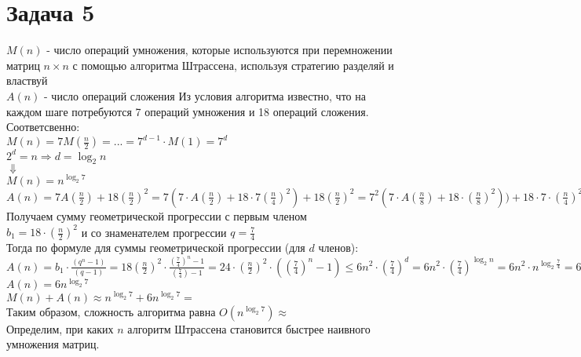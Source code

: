 \documentclass[12pt]{article}
\begin{document}
	\section*{Задача 5}
	$M(n)$ - число операций умножения, которые используются при перемножении матриц $n\times n$ с помощью алгоритма Штрассена, используя стратегию разделяй и властвуй\\
	$A(n)$ - число операций сложения
	Из условия алгоритма известно, что на каждом шаге потребуются 7 операций умножения и 18 операций сложения. Соответсвенно:\\
	$M(n) = 7M(\frac{n}{2}) = ... = 7^{d-1}\cdot M(1) = 7^{d}$\\
	$2^{d} = n \Rightarrow d = \log_{2}{n}$\\
	$\Downarrow$	\\
	$M(n) = n^{\log_{2}{7}}$ \\
	$A(n) = 7A(\frac{n}{2}) + 18{(\frac{n}{2})}^2 = 7(7\cdot A(\frac{n}{2}) + 18\cdot7{(\frac{n}{4})}^2) + 18{(\frac{n}{2})}^2 = 7^{2}(7\cdot A(\frac{n}{8}) + 18\cdot {(\frac{n}{8})}^2)) + 18\cdot 7\cdot{(\frac{n}{4})}^2 + 18\cdot {(\frac{n}{2})}^2 = 7^{3}\cdot A(\frac{n}{8}) + 7^{2}\cdot 18{(\frac{n}{8})}^2 + 18 \cdot 7{(\frac{n}{4})}^2 + 18\cdot {(\frac{n}{2})}^2$ \\
	Получаем сумму геометрической прогрессии с первым членом \\ 
	$b_{1} = 18\cdot {(\frac{n}{2})}^2$ и со знаменателем прогрессии $q = \frac{7}{4}$ \\
	Тогда по формуле для суммы геометрической прогрессии (для $d$ членов): \\
	$A(n) = b_{1}\cdot \frac{(q^{n} - 1)}{(q - 1)} = 18{(\frac{n}{2})}^2 \cdot \frac{{(\frac{7}{4})}^{n} - 1}{(\frac{7}{4}) - 1} = 24\cdot {(\frac{n}{2})}^2 \cdot ({(\frac{7}{4})}^n - 1) \leq 6n^{2}\cdot {(\frac{7}{4})}^{d} = 6n^{2}\cdot {(\frac{7}{4})}^{\log_{2}{n}} = 6n^{2}\cdot n^{\log_{2}{\frac{7}{4}}} = 6n^{2}\cdot n^{\log_{2}{7}}\cdot \frac{1}{n^{2}} = 6n^{\log_{2}{7}} \Longrightarrow$ \\
	$A(n) = 6n^{\log_{2}{7}}$ \\
	$M(n) + A(n) \approx n^{\log_{2}{7}} + 6n^{\log_{2}{7}} =$  \\
	Таким образом, сложность алгоритма равна $O(n^{\log_{2}{7}}) \approx$  \\
	Определим, при каких $n$ алгоритм Штрассена становится быстрее наивного умножения матриц. \\
\end{document}
